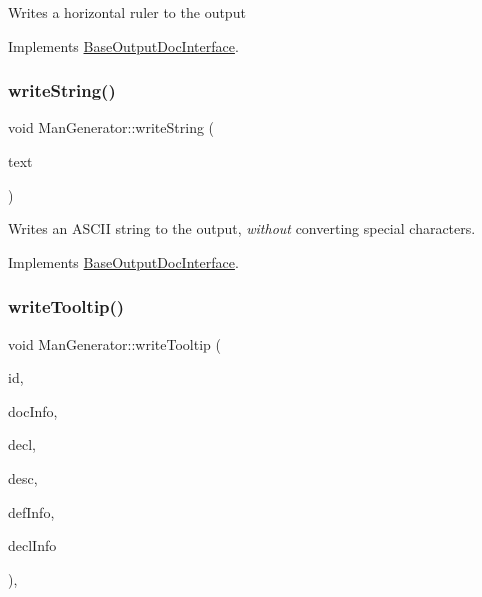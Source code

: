 Writes a horizontal ruler to the output 

Implements \mbox{\hyperlink{class_base_output_doc_interface_ade0d004fb6e8641c92f2f144d7242f0b}{Base\+Output\+Doc\+Interface}}.

\mbox{\label{class_man_generator_a39ca2f1de2bbbe5548f6f03997a84c88}} 
\subsubsection{\texorpdfstring{writeString()}{writeString()}}
{\footnotesize\ttfamily void Man\+Generator\+::write\+String (\begin{DoxyParamCaption}\item[{const char $\ast$}]{text }\end{DoxyParamCaption})\hspace{0.3cm}{\ttfamily [virtual]}}

Writes an A\+S\+C\+II string to the output, {\itshape without} converting special characters. 

Implements \mbox{\hyperlink{class_base_output_doc_interface_a5737513ddf260787b5b79c84ae1059af}{Base\+Output\+Doc\+Interface}}.

\mbox{\label{class_man_generator_a8ec440b278091bf61579f35cd8237a25}} 
\subsubsection{\texorpdfstring{writeTooltip()}{writeTooltip()}}
{\footnotesize\ttfamily void Man\+Generator\+::write\+Tooltip (\begin{DoxyParamCaption}\item[{const char $\ast$}]{id,  }\item[{const \mbox{\hyperlink{struct_doc_link_info}{Doc\+Link\+Info}} \&}]{doc\+Info,  }\item[{const char $\ast$}]{decl,  }\item[{const char $\ast$}]{desc,  }\item[{const \mbox{\hyperlink{struct_source_link_info}{Source\+Link\+Info}} \&}]{def\+Info,  }\item[{const \mbox{\hyperlink{struct_source_link_info}{Source\+Link\+Info}} \&}]{decl\+Info }\end{DoxyParamCaption})\hspace{0.3cm}{\ttfamily [inline]}, {\ttfamily [virtual]}}

